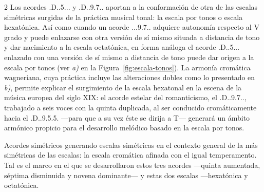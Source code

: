 \documentclass[a4paper,11pt]{article}
\begin{document}
\begin{multicols}{2}
Los acordes \acorde.D..5\sostenidotxt... y \acorde.D..9.7.. aportan a la conformación de otra de las escalas simétricas surgidas de la práctica musical tonal: la escala por tonos o escala hexatónica. Así como cuando un acorde \acorde.\Dohne..9\bemoltxt.7.. adquiere autonomía respecto al V grado y puede enlazarse con otra versión de sí mismo situada a distancia de tono y dar nacimiento a la escala octatónica, en forma análoga el acorde \acorde.D..5\sostenidotxt... enlazado con una versión de sí mismo a distancia de tono puede dar origen a la escala por tonos (ver \emph{a)} en la Figura~\ref{fig:escala-tonos}). La armonía cromática wagneriana, cuya práctica incluye las alteraciones dobles como lo presentado en \emph{b)}, permite explicar el surgimiento de la escala hexatonal en la escena de la música europea del siglo XIX: el acorde estelar del romanticismo, el \acorde.D..9.7.., trabajado a seis voces con la quinta duplicada, al ser conducido cromáticamente hacia el \acorde.D..9.5\sostenidotxt.5\bemoltxt. ---para que a su vez éste se dirija a T--- generará un ámbito armónico propicio para el desarrollo melódico basado en la escala por tonos.

Acordes simétricos generando escalas simétricas en el contexto general de la más simétricas de las escalas: la escala cromática afinada con el igual temperamento. Tal es el marco en el que se desarrollaron estos tres acordes ---quinta aumentada, séptima disminuida y novena dominante--- y estas dos escalas ---hexatónica y octatónica.

\bigskip


\end{multicols}
\end{document}
